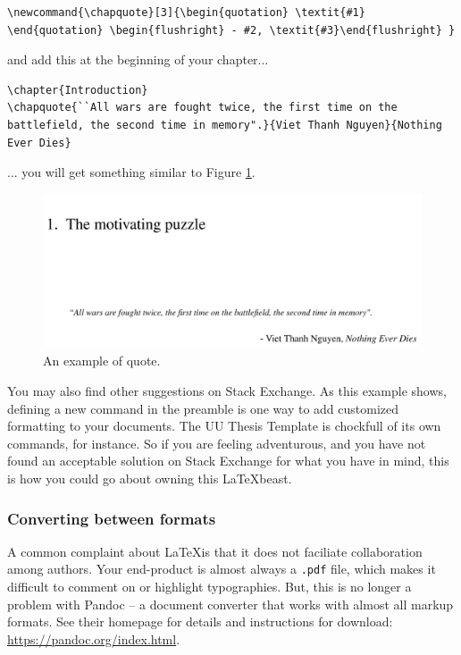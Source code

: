 \documentclass[12pt, letterpaper]{article}
\begin{document}
\begin{lstlisting}
\newcommand{\chapquote}[3]{\begin{quotation} \textit{#1} \end{quotation} \begin{flushright} - #2, \textit{#3}\end{flushright} }
\end{lstlisting}

and add this at the beginning of your chapter... 

\begin{lstlisting}
\chapter{Introduction}
\chapquote{``All wars are fought twice, the first time on the battlefield, the second time in memory".}{Viet Thanh Nguyen}{Nothing Ever Dies}
\end{lstlisting}
... you will get something similar to Figure \ref{fig1}.

\begin{figure}
\centering
\includegraphics[width=\linewidth, frame]{introquote.png}
\caption{An example of quote.}
\label{fig1}
\end{figure}

You may also find other suggestions on Stack Exchange. As this example shows, defining a new command in the preamble is one way to add customized formatting to your documents. The UU Thesis Template is chockfull of its own commands, for instance. So if you are feeling adventurous, and you have not found an acceptable solution on Stack Exchange for what you have in mind, this is how you could go about owning this \LaTeX beast.

\subsubsection{Converting between formats} \label{sssec:num2}
A common complaint about \LaTeX is that it does not faciliate collaboration among authors. Your end-product is almost always a \verb|.pdf| file, which makes it difficult to comment on or highlight typographies. But, this is no longer a problem with Pandoc -- a document converter that works with almost all markup formats. See their homepage for details and instructions for download: \href{https://pandoc.org/index.html}{https://pandoc.org/index.html}. 
\end{document}
